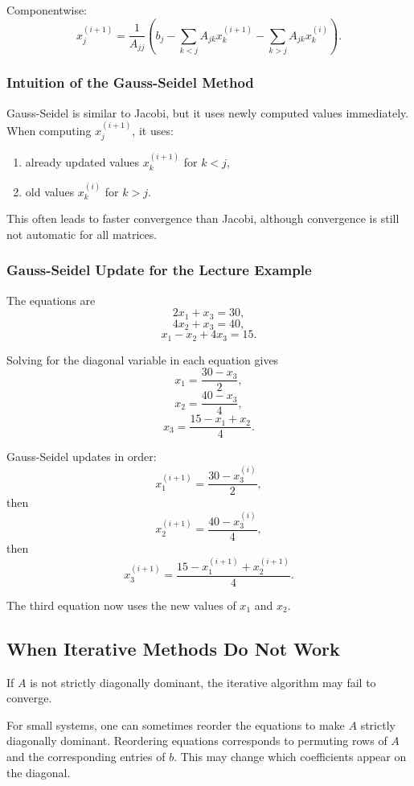 \documentclass[10pt, letterpaper]{article}
\begin{document}
Componentwise:
\[
x_j^{(i+1)}
=
\frac{1}{A_{jj}}
\left(
b_j
-
\sum_{k<j}A_{jk}x_k^{(i+1)}
-
\sum_{k>j}A_{jk}x_k^{(i)}
\right).
\]

\subsubsection{Intuition of the Gauss-Seidel Method}

Gauss-Seidel is similar to Jacobi, but it uses newly computed values immediately. When computing \(x_j^{(i+1)}\), it uses:
\begin{enumerate}
    \item already updated values \(x_k^{(i+1)}\) for \(k<j\),
    \item old values \(x_k^{(i)}\) for \(k>j\).
\end{enumerate}

This often leads to faster convergence than Jacobi, although convergence is still not automatic for all matrices.

\subsubsection{Gauss-Seidel Update for the Lecture Example}

The equations are
\[
2x_1+x_3=30,
\]
\[
4x_2+x_3=40,
\]
\[
x_1-x_2+4x_3=15.
\]

Solving for the diagonal variable in each equation gives
\[
x_1=\frac{30-x_3}{2},
\]
\[
x_2=\frac{40-x_3}{4},
\]
\[
x_3=\frac{15-x_1+x_2}{4}.
\]

Gauss-Seidel updates in order:
\[
x_1^{(i+1)}
=
\frac{30-x_3^{(i)}}{2},
\]
then
\[
x_2^{(i+1)}
=
\frac{40-x_3^{(i)}}{4},
\]
then
\[
x_3^{(i+1)}
=
\frac{15-x_1^{(i+1)}+x_2^{(i+1)}}{4}.
\]

The third equation now uses the new values of \(x_1\) and \(x_2\).

\subsection{When Iterative Methods Do Not Work}

If \(A\) is not strictly diagonally dominant, the iterative algorithm may fail to converge.

For small systems, one can sometimes reorder the equations to make \(A\) strictly diagonally dominant. Reordering equations corresponds to permuting rows of \(A\) and the corresponding entries of \(b\). This may change which coefficients appear on the diagonal.
\end{document}
